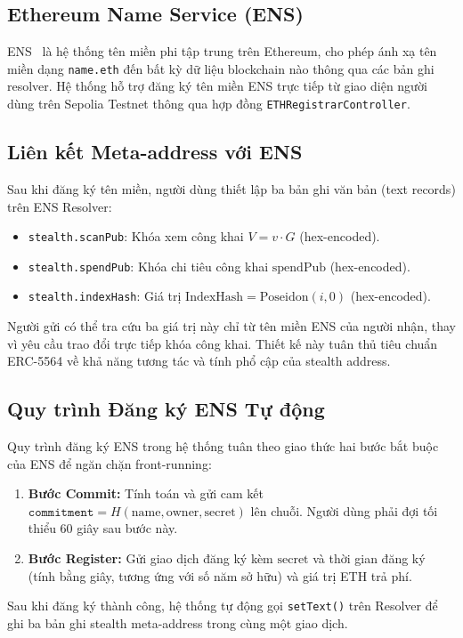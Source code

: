 \documentclass[../DoAn.tex]{subfiles}
\begin{document}
\subsection{Ethereum Name Service (ENS)}

ENS~\cite{ens} là hệ thống tên miền phi tập trung trên Ethereum, cho phép ánh xạ tên miền dạng \texttt{name.eth} đến bất kỳ dữ liệu blockchain nào thông qua các bản ghi resolver. Hệ thống hỗ trợ đăng ký tên miền ENS trực tiếp từ giao diện người dùng trên Sepolia Testnet thông qua hợp đồng \texttt{ETHRegistrarController}.

\subsection{Liên kết Meta-address với ENS}

Sau khi đăng ký tên miền, người dùng thiết lập ba bản ghi văn bản (text records) trên ENS Resolver:
\begin{itemize}
    \item \texttt{stealth.scanPub}: Khóa xem công khai \(V = v \cdot G\) (hex-encoded).
    \item \texttt{stealth.spendPub}: Khóa chi tiêu công khai \(\text{spendPub}\) (hex-encoded).
    \item \texttt{stealth.indexHash}: Giá trị \(\text{IndexHash} = \text{Poseidon}(i, 0)\) (hex-encoded).
\end{itemize}

Người gửi có thể tra cứu ba giá trị này chỉ từ tên miền ENS của người nhận, thay vì yêu cầu trao đổi trực tiếp khóa công khai. Thiết kế này tuân thủ tiêu chuẩn ERC-5564 về khả năng tương tác và tính phổ cập của stealth address.

\subsection{Quy trình Đăng ký ENS Tự động}

Quy trình đăng ký ENS trong hệ thống tuân theo giao thức hai bước bắt buộc của ENS để ngăn chặn front-running:

\begin{enumerate}
    \item \textbf{Bước Commit:} Tính toán và gửi cam kết \(\texttt{commitment} = H(\text{name}, \text{owner}, \text{secret})\) lên chuỗi. Người dùng phải đợi tối thiểu 60 giây sau bước này.
    \item \textbf{Bước Register:} Gửi giao dịch đăng ký kèm \(\text{secret}\) và thời gian đăng ký (tính bằng giây, tương ứng với số năm sở hữu) và giá trị ETH trả phí.
\end{enumerate}

Sau khi đăng ký thành công, hệ thống tự động gọi \texttt{setText()} trên Resolver để ghi ba bản ghi stealth meta-address trong cùng một giao dịch.
\end{document}
